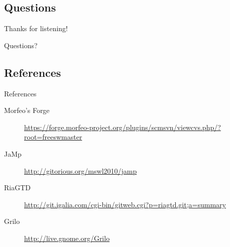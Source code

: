 \documentclass{beamer}
\begin{document}
\subsection*{Questions}

\begin{frame}{Thanks for listening!}
\begin{center}
\huge{
Questions?
}
\end{center}
\end{frame}

\subsection*{References}

\begin{frame}{References}
\scriptsize{
\begin{description}
\item[Morfeo's Forge]
\url{https://forge.morfeo-project.org/plugins/scmsvn/viewcvs.php/?root=freeswmaster}
\item[JaMp] \url{http://gitorious.org/mswl2010/jamp}
\item[RiaGTD] \url{http://git.igalia.com/cgi-bin/gitweb.cgi?p=riagtd.git;a=summary}
\item[Grilo] \url{http://live.gnome.org/Grilo}
\end{description}}
\end{frame}
\end{document}
